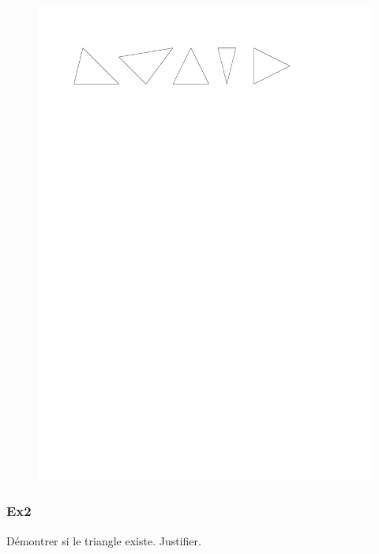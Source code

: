 \documentclass[11pt]{article}
\begin{document}
\begin{figure}[H]
  \centering
  \includegraphics[width=\linewidth]{5x2-triangles/sources/ex1.1.pdf}
\end{figure}

\subsubsection*{Ex2}

Démontrer si le triangle existe. Justifier.
\end{document}
